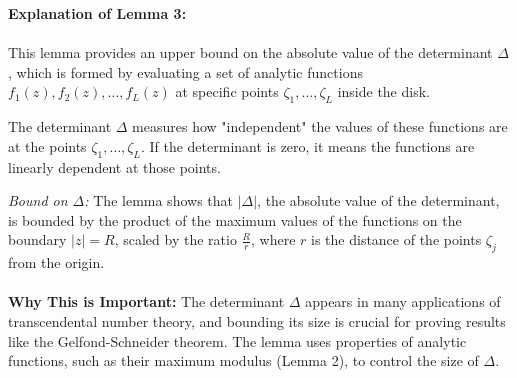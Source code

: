 \documentclass{article}
\begin{document}

\textbf{Explanation of Lemma 3:}\\\\
This lemma provides an upper bound on the absolute value of the determinant \( \Delta \), which is formed by evaluating a set of analytic functions \( f_1(z), f_2(z), \dots, f_L(z) \) at specific points \( \zeta_1, \dots, \zeta_L \) inside the disk.

The determinant \( \Delta \) measures how "independent" the values of these functions are at the points \( \zeta_1, \dots, \zeta_L \). If the determinant is zero, it means the functions are linearly dependent at those points.

\emph{Bound on \( \Delta \):} The lemma shows that \( |\Delta| \), the absolute value of the determinant, is bounded by the product of the maximum values of the functions on the boundary \( |z| = R \), scaled by the ratio \( \frac{R}{r} \), where \( r \) is the distance of the points \( \zeta_j \) from the origin.\\\\
\textbf{Why This is Important:} 
The determinant \( \Delta \) appears in many applications of transcendental number theory, and bounding its size is crucial for proving results like the Gelfond-Schneider theorem. The lemma uses properties of analytic functions, such as their maximum modulus (Lemma 2), to control the size of \( \Delta \).
\end{document}
